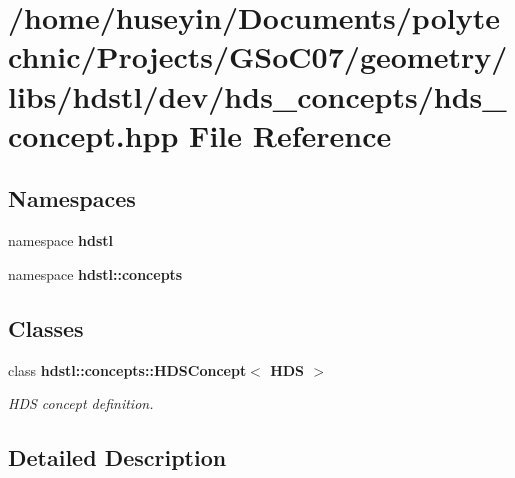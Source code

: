 \section{/home/huseyin/Documents/polytechnic/Projects/GSo\-C07/geometry/libs/hdstl/dev/hds\_\-concepts/hds\_\-concept.hpp File Reference}
\label{hds__concept_8hpp}
\subsection*{Namespaces}
\begin{CompactItemize}
\item 
namespace \textbf{hdstl}
\item 
namespace \textbf{hdstl::concepts}
\end{CompactItemize}
\subsection*{Classes}
\begin{CompactItemize}
\item 
class \bf{hdstl::concepts::HDSConcept$<$ HDS $>$}
\begin{CompactList}\small\item\em HDS concept definition. \item\end{CompactList}\end{CompactItemize}


\subsection{Detailed Description}
